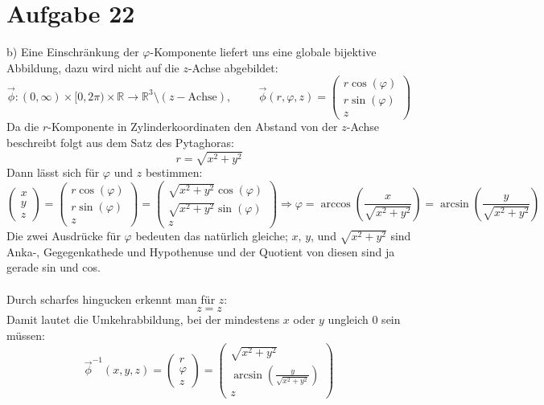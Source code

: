 \documentclass[10pt]{article}
\begin{document}
\section*{Aufgabe 22}
b) Eine Einschränkung der $\varphi$-Komponente liefert uns eine 
globale bijektive Abbildung, dazu wird nicht auf die $z$-Achse 
abgebildet:
\[
	\vec \phi: (0,\infty) \times [0, 2\pi) \times \mathbb R 
	\rightarrow \mathbb R^3 \setminus(z-\text{Achse})
	, 
	\hspace{1cm}
	\vec \phi (r,\varphi, z) =
	\begin{pmatrix}
		r \cos(\varphi) \\
		r \sin(\varphi) \\
		z
	\end{pmatrix}
\]
Da die $r$-Komponente in Zylinderkoordinaten den Abstand von der $z$-Achse
beschreibt folgt aus dem Satz des Pytaghoras:
\[
	r = \sqrt{x^2 + y^2}
\]
Dann lässt sich für $\varphi$ und $z$ bestimmen:
\[
	\begin{pmatrix} x \\ y \\ z \end{pmatrix}
	=
	\begin{pmatrix} r\cos(\varphi) \\ r\sin(\varphi) \\ z \end{pmatrix}
	=
	\begin{pmatrix} 
		\sqrt{x^2 + y^2} \cos(\varphi) \\ 
		\sqrt{x^2 + y^2} \sin(\varphi) \\ 
		z 
	\end{pmatrix}
	\Rightarrow
	\varphi 
	= \arccos\left(\frac{x}{\sqrt{x^2+y^2}}\right)
	=\arcsin\left(\frac{y}{\sqrt{x^2+y^2}}\right)
\]
Die zwei Ausdrücke für $\varphi$ bedeuten das natürlich 
gleiche; $x$, $y$, und
$\sqrt{x^2 + y^2}$ sind Anka-, Gegegenkathede und Hypothenuse und der 
Quotient von diesen sind ja gerade sin und cos. \\
\hspace{0.2cm}
\\
Durch scharfes hingucken erkennt man für $z$:
\[
	z = z
\]
Damit lautet die Umkehrabbildung, bei der mindestens $x$ oder $y$ ungleich
0 sein müssen:
\[
	\vec \phi^{-1}(x,y,z)
	=
	\begin{pmatrix}
		r \\ \varphi \\ z
	\end{pmatrix}
	=
	\begin{pmatrix}
		\sqrt{x^2 + y^2} \\
		\arcsin\left(\frac{y}{\sqrt{x^2+y^2}}\right) \\
		z
	\end{pmatrix}
\]
\end{document}
